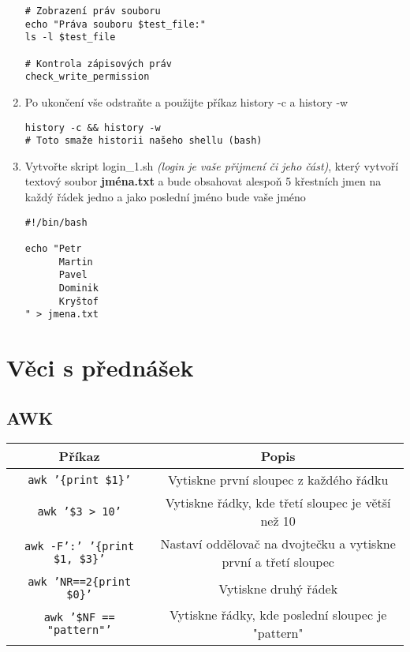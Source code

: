 \documentclass{article}
\begin{document}
\begin{enumerate}
\begin{lstlisting}[caption=zapis.sh musel jsem modifikovat pipe aby se zobrazil ale normálně je to jen ta vertikalní čárka]
# Zobrazení práv souboru
echo "Práva souboru $test_file:"
ls -l $test_file

# Kontrola zápisových práv
check_write_permission
\end{lstlisting}
  \item Po ukončení vše odstraňte a použijte příkaz history -c a history -w
\begin{lstlisting}
history -c && history -w 
# Toto smaže historii našeho shellu (bash)
\end{lstlisting}
\item Vytvořte skript login\_1.sh \textit{(login je vaše přijmení či jeho část)}, který vytvoří textový soubor \textbf{jména.txt} a bude obsahovat alespoň 5 křestních jmen na každý řádek jedno a jako poslední jméno bude vaše jméno
\begin{lstlisting}
#!/bin/bash

echo "Petr
      Martin
      Pavel
      Dominik
      Kryštof
" > jmena.txt
\end{lstlisting}

\end{enumerate}
\section{Věci s přednášek}
\subsection{AWK}
\begin{center}
\begin{tabular}{|c|c|}
\hline
\textbf{Příkaz} & \textbf{Popis} \\
\hline
\texttt{awk '\{print \$1\}'} & Vytiskne první sloupec z každého řádku \\
\hline
\texttt{awk '\$3 > 10'} & Vytiskne řádky, kde třetí sloupec je větší než 10 \\
\hline
\texttt{awk -F':' '\{print \$1, \$3\}'} & Nastaví oddělovač na dvojtečku a vytiskne první a třetí sloupec \\
\hline
\texttt{awk 'NR==2\{print \$0\}'} & Vytiskne druhý řádek \\
\hline
\texttt{awk '\$NF == "pattern"'} & Vytiskne řádky, kde poslední sloupec je "pattern" \\
\hline
\end{tabular}
\end{center}
\end{document}
